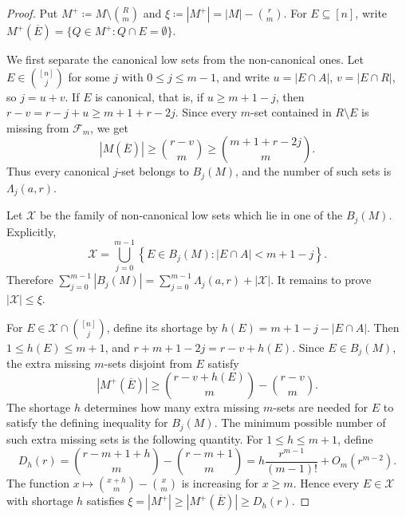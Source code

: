 \documentclass[10pt,a4paper]{article}
\numberwithin{equation}{section}
\theoremstyle{definition}
\newtheorem{claim}[claim]{Claim}
\newcommand{\F}{\mathcal F}
\begin{document}
\begin{proof}
    Put \(M^+\coloneqq M\setminus\binom Rm\) and
    \(\xi\coloneqq |M^+|=|M|-\binom rm\).
    For \(E\subseteq[n]\), write
    \(M^+(\overline E)=\{Q\in M^+:Q\cap E=\emptyset\}\).

    We first separate the canonical low sets from the non-canonical ones.  Let \(E\in\binom{[n]}j\) for some $j$ with \(0\le j\le m-1\), and write
    \(u=|E\cap A|\), \(v=|E\cap R|\), so \(j=u+v\).
    If \(E\) is canonical, that is, if \(u\ge m+1-j\), then
    \(r-v=r-j+u\ge m+1+r-2j\).
    Since every \(m\)-set contained in \(R\setminus E\) is missing from \(\F_m\), we get
    \[
        |M(\overline E)|\ge\binom{r-v}{m}
        \ge \binom{m+1+r-2j}{m}.
    \]
    Thus every canonical \(j\)-set belongs to \(B_j(M)\), and the number of
    such sets is \(\Lambda_j(a,r)\).

    Let \(\mathcal X\) be the family of non-canonical low sets which lie in
    one of the \(B_j(M)\).  Explicitly,
    \[
        \mathcal X=
        \bigcup_{j=0}^{m-1}
        \left\{
        E\in B_j(M): |E\cap A|<m+1-j
        \right\}.
    \]
    Therefore
    \(\sum_{j=0}^{m-1}|B_j(M)| = \sum_{j=0}^{m-1}\Lambda_j(a,r)+|\mathcal X|.\)
    It remains to prove \(|\mathcal X|\le\xi\).

    For \(E\in\mathcal X\cap\binom{[n]}j\), define its shortage by
    \(h(E)=m+1-j-|E\cap A|\).  Then \(1\le h(E)\le m+1\), and
    \(r+m+1-2j=r-v+h(E)\).  Since \(E\in B_j(M)\), the extra missing
    \(m\)-sets disjoint from \(E\) satisfy
    \[
        |M^+(\overline E)|
        \ge
        \binom{r-v+h(E)}m-\binom{r-v}m.
    \]
    The shortage $h$ determines how many extra missing $m$-sets are needed
    for $E$ to satisfy the defining inequality for $B_j(M)$.  The minimum possible number
    of such extra missing sets is the following quantity.
    For \(1\le h\le m+1\), define
    \begin{equation}\label{eq:case1-dh}
        D_h(r)=\binom{r-m+1+h}{m}-\binom{r-m+1}{m}=h \frac{r^{m-1}}{(m-1)!}+O_m(r^{m-2}).
    \end{equation}
    The function \(x\mapsto\binom{x+h}{m}-\binom xm\) is increasing for \(x\ge m\).
    Hence every \(E\in\mathcal X\) with shortage \(h\) satisfies
    \(\xi=|M^+|\ge |M^+(\overline E)|\ge D_h(r).\)


\end{proof}
\end{document}
